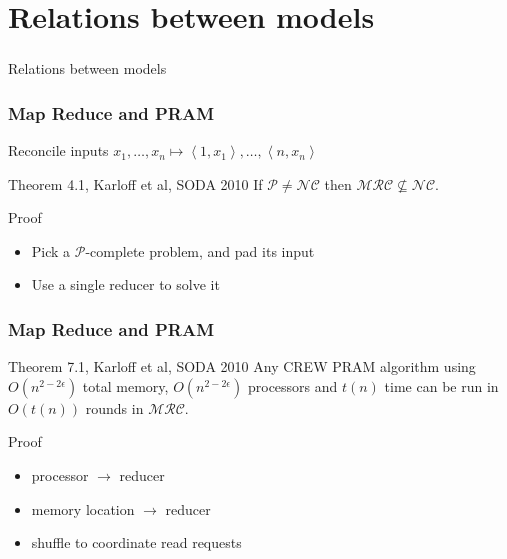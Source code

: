 \documentclass[12pt,aspectratio=169]{beamer}
\begin{document}
  \section{Relations between models}
\begin{frame}\frametitle{}
  \begin{center}
    \Huge
    Relations between models
  \end{center}
\end{frame}

\begin{frame}\frametitle{Map Reduce and PRAM}

\begin{block}{Reconcile inputs}
  $x_{1}, \ldots , x_{n} \mapsto \left\langle 1, x_{1} \right\rangle, \ldots ,
\left\langle n,x_{n} \right\rangle $
\end{block}

\begin{block}{Theorem 4.1, Karloff et al, SODA 2010}
  If $\mathcal{P} \neq \mathcal{NC}$ then $\mathcal{MRC} \not\subseteq
  \mathcal{NC}$.
\end{block}

\begin{block}{Proof}
  \begin{itemize}
  \item
    Pick a $\mathcal{P}$-complete problem, and pad its input
  \item
    Use a single reducer to solve it
  \end{itemize}
\end{block}
\end{frame}


\begin{frame}\frametitle{Map Reduce and PRAM}
\begin{block}{Theorem 7.1, Karloff et al, SODA 2010}
Any CREW PRAM algorithm using
$O(n^{2-2\epsilon})$ total memory, $O(n^{2-2\epsilon})$ processors and $t(n)$
time can be run in $O(t(n))$ rounds in $\mathcal{MRC}$.
\end{block}

\begin{block}{Proof}
  \begin{itemize}
  \item
    processor $\to$ reducer
  \item
    memory location $\to$ reducer
  \item
    shuffle to coordinate read requests
  \end{itemize}
\end{block}
\end{frame}
\end{document}
